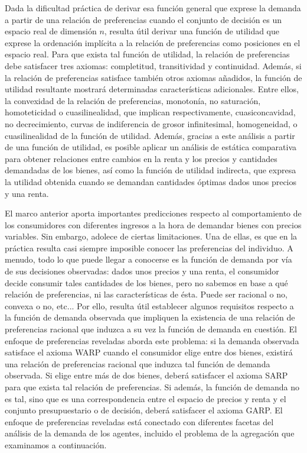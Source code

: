 \documentclass{nuevotema}
\begin{document}
Dada la dificultad práctica de derivar esa función general que exprese la demanda a partir de una relación de preferencias cuando el conjunto de decisión es un espacio real de dimensión $n$, resulta útil derivar una función de utilidad que exprese la ordenación implícita a la relación de preferencias como posiciones en el espacio real. Para que exista tal función de utilidad, la relación de preferencias debe satisfacer tres axiomas: completitud, transitividad y continuidad. Además, si la relación de preferencias satisface también otros axiomas añadidos, la función de utilidad resultante mostrará determinadas características adicionales. Entre ellos, la convexidad de la relación de preferencias, monotonía, no saturación, homoteticidad o cuasilinealidad, que implican respectivamente, cuasiconcavidad, no decrecimiento, curvas de indiferencia de grosor infinitesimal, homogeneidad, o cuasilinealidad de la función de utilidad. Además, gracias a este análisis a partir de una función de utilidad, es posible aplicar un análisis de estática comparativa para obtener relaciones entre cambios en la renta y los precios y cantidades demandadas de los bienes, así como la función de utilidad indirecta, que expresa la utilidad obtenida cuando se demandan cantidades óptimas dados unos precios y una renta.

El marco anterior aporta importantes predicciones respecto al comportamiento de los consumidores con diferentes ingresos a la hora de demandar bienes con precios variables. Sin embargo, adolece de ciertas limitaciones. Una de ellas, es que en la práctica resulta casi siempre imposible conocer las preferencias  del individuo. A menudo, todo lo que puede llegar a conocerse es la función de demanda por vía de sus decisiones observadas: dados unos precios y una renta, el consumidor decide consumir tales cantidades de los bienes, pero no sabemos en base a qué relación de preferencias, ni las características de ésta. Puede ser racional o no, convexa o no, etc... Por ello, resulta útil establecer algunos requisitos respecto a la función de demanda observada que impliquen la existencia de una relación de preferencias racional que induzca a su vez la función de demanda en cuestión. El enfoque de preferencias reveladas aborda este problema: si la demanda observada satisface el axioma WARP cuando el consumidor elige entre dos bienes, existirá una relación de preferencias racional que induzca tal función de demanda observada. Si elige entre más de dos bienes, deberá satisfacer el axioma SARP para que exista tal relación de preferencias. Si además, la función de demanda no es tal, sino que es una correspondencia entre el espacio de precios y renta y el conjunto presupuestario o de decisión, deberá satisfacer el axioma GARP. El enfoque de preferencias reveladas está conectado con diferentes facetas del análisis de la demanda de los agentes, incluido el problema de la agregación que examinamos a continuación.
\end{document}
